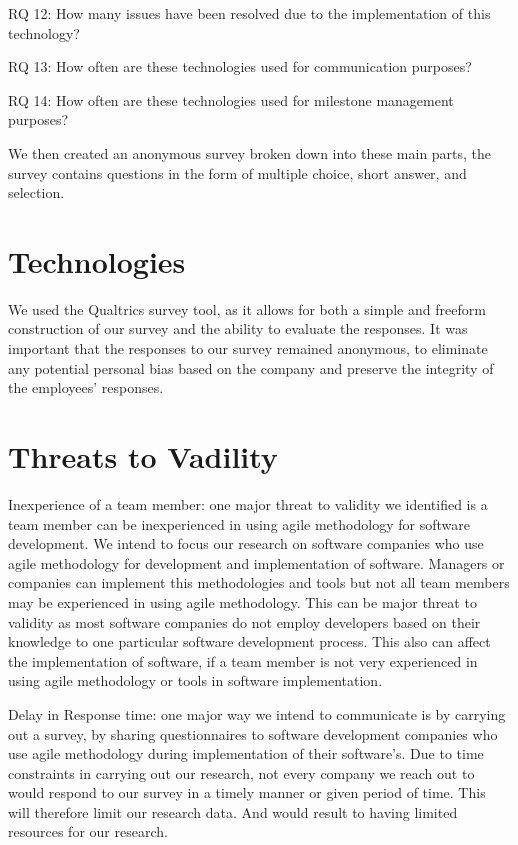\documentclass[conference]{IEEEtran}
\begin{document}
RQ 12: How many issues have been resolved due to the implementation of this technology? 

RQ 13: How often are these technologies used for communication purposes? 

RQ 14: How often are these technologies used for milestone management purposes? 
 

We then created an anonymous survey broken down into these main parts, the survey contains questions in the form of multiple choice, short answer, and selection.  

\section{Technologies}
We used the Qualtrics survey tool, as it allows for both a simple and freeform construction of our survey and the ability to evaluate the responses. It was important that the responses to our survey remained anonymous, to eliminate any potential personal bias based on the company and preserve the integrity of the employees' responses. 

\section{Threats to Vadility}

Inexperience of a team member: one major threat to validity we identified is a team member can be inexperienced in using agile methodology for software development. We intend to focus our research on software companies who use agile methodology for development and implementation of software. Managers or companies can implement this methodologies and tools but not all team members may be experienced in using agile methodology. This can be major threat to validity as most software companies do not employ developers based on their knowledge to one particular software development process. This also can affect the implementation of software, if a team member is not very experienced in using agile methodology or tools in software implementation.

Delay in Response time: one major way we intend to communicate is by carrying out a survey, by sharing questionnaires to software development companies who use agile methodology during implementation of their software’s. Due to time constraints in carrying out our research, not every company we reach out to would respond to our survey in a timely manner or given period of time. This will therefore limit our research data. And would result to having limited resources for our research.
\end{document}
